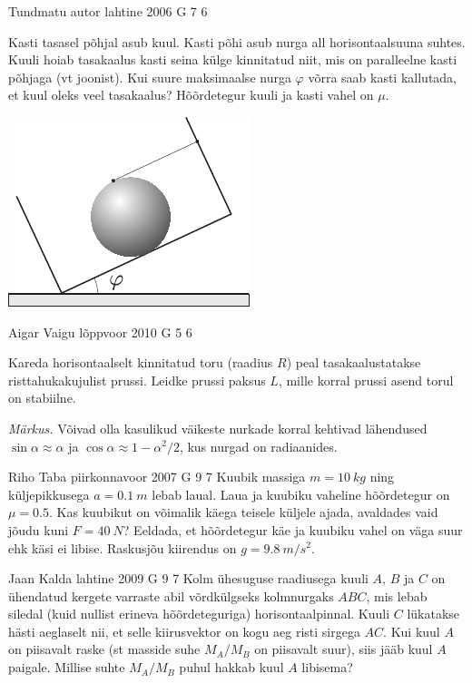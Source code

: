 \documentclass[11pt, twoside]{article}
\begin{document}
{%
{Tundmatu autor} %
{lahtine} %
{2006} %
{G 7} %
{6} %
{
\ifStatement
Kasti tasasel põhjal asub kuul. Kasti põhi asub nurga all horisontaalsuuna suhtes. Kuuli hoiab tasakaalus kasti seina külge kinnitatud niit, mis on paralleelne kasti põhjaga (vt joonist). Kui suure maksimaalse nurga $\varphi$ võrra saab kasti kallutada, et kuul oleks veel tasakaalus? Hõõrdetegur kuuli ja kasti vahel on $\mu$.

\begin{center}
	\includegraphics[width=0.5\linewidth]{2006-lahg-07-yl}
\end{center}
\fi
}

{Aigar Vaigu} %
{lõppvoor} %
{2010} %
{G 5} %
{6} %
{
\ifStatement
Kareda horisontaalselt kinnitatud toru (raadius $R$) peal tasakaalustatakse risttahukakujulist prussi. Leidke prussi paksus $L$, mille
korral prussi asend torul on stabiilne.

\emph{Märkus.} Võivad olla kasulikud väikeste nurkade korral kehtivad lähendused
$\sin\alpha\approx \alpha$ ja $\cos\alpha\approx 1-\alpha^2/2$, kus nurgad on radiaanides.
\fi
}

{Riho Taba} %
{piirkonnavoor} %
{2007} %
{G 9} %
{7} %
{
\ifStatement
Kuubik massiga $m = \SI{10}{kg}$ ning küljepikkusega $a = \SI{0,1}{m}$ lebab laual. Laua ja kuubiku vaheline hõõrdetegur on $\mu = \num{0,5}$. Kas kuubikut on võimalik käega teisele küljele ajada, avaldades vaid jõudu kuni $F = \SI{40}{N}$? Eeldada, et hõõrdetegur käe ja kuubiku vahel on väga suur ehk käsi ei libise. Raskusjõu kiirendus on $g = \SI{9,8}{m/s^2}$.
\fi
}

{Jaan Kalda} %
{lahtine} %
{2009} %
{G 9} %
{7} %
{
\ifStatement
Kolm ühesuguse raadiusega kuuli $A$, $B$ ja $C$ on ühendatud kergete varraste abil võrdkülgseks kolmnurgaks $ABC$, mis lebab siledal (kuid nullist erineva hõõrdeteguriga) horisontaalpinnal. Kuuli $C$ lükatakse hästi aeglaselt nii, et selle kiirusvektor on kogu aeg risti sirgega $AC$. Kui kuul $A$ on piisavalt raske (st masside suhe $M_A/M_B$ on piisavalt suur), siis jääb kuul $A$ paigale. Millise suhte $M_A/M_B$ puhul hakkab kuul $A$ libisema?
\fi
}

}
\end{document}
